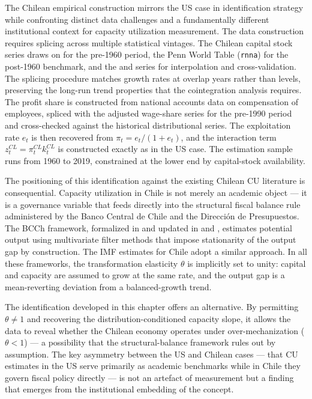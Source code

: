 \documentclass[12pt,letterpaper]{article}
\newcommand{\pit}{\pi_t}           %
\begin{document}
The Chilean empirical construction mirrors the US case in identification
strategy while confronting distinct data challenges and a fundamentally
different institutional context for capacity utilization measurement. The data
construction requires splicing across multiple statistical vintages. The
Chilean capital stock series draws on \citet{hofman2000} for the pre-1960
period, the Penn World Table (\texttt{rnna}) for the post-1960 benchmark, and
the \citet{luders2016} and \citet{perez2019} series for interpolation and
cross-validation. The splicing procedure matches growth rates at overlap years
rather than levels, preserving the long-run trend properties that the
cointegration analysis requires. The profit share is constructed from national
accounts data on compensation of employees, spliced with the
\citet{alarco2014} adjusted wage-share series for the pre-1990 period and
cross-checked against the \citet{astorga2023} historical distributional series.
The exploitation rate $e_t$ is then recovered from
$\pit = e_t/(1+e_t)$, and the interaction term
$z_t^{CL} = \pi^{CL}_t k^{CL}_t$ is constructed exactly as in the US case.
The estimation sample runs from 1960 to 2019, constrained at the lower end by
capital-stock availability.

The positioning of this identification against the existing Chilean CU
literature is consequential. Capacity utilization in Chile is not merely an
academic object --- it is a governance variable that feeds directly into the
structural fiscal balance rule administered by the Banco Central de Chile and
the Direcci\'on de Presupuestos. The BCCh framework, formalized in
\citet{fuentes2008} and updated in \citet{figueroa2019} and
\citet{durand2024}, estimates potential output using multivariate filter methods
that impose stationarity of the output gap by construction. The
\citet{magud2011} IMF estimates for Chile adopt a similar approach. In all
these frameworks, the transformation elasticity $\theta$ is implicitly set to
unity: capital and capacity are assumed to grow at the same rate, and the output
gap is a mean-reverting deviation from a balanced-growth trend.

The identification developed in this chapter offers an alternative. By
permitting $\theta \neq 1$ and recovering the distribution-conditioned capacity
slope, it allows the data to reveal whether the Chilean economy operates under
over-mechanization ($\theta < 1$) --- a possibility that the structural-balance
framework rules out by assumption. The key asymmetry between the US and Chilean
cases --- that CU estimates in the US serve primarily as academic benchmarks
while in Chile they govern fiscal policy directly --- is not an artefact of
measurement but a finding that emerges from the institutional embedding of the
concept.
\end{document}
